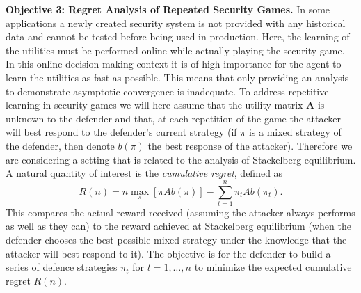 \textbf{Objective 3: Regret Analysis of Repeated Security Games.}
In some applications a newly created security system is not provided with any historical data and cannot be tested before being used in production. Here, the learning of the utilities must be performed online while actually playing the security game. In this online decision-making context it is of high importance for the agent to learn the utilities as fast as possible. This means that only providing an analysis to demonstrate asymptotic convergence\cite{LeslieCollins06,ChapmanEtAl2013} is inadequate. To address repetitive learning in security games we will here assume that the utility matrix $\boldsymbol  A$ is unknown to the defender and that, at each repetition of the game the attacker will best respond to the defender's current strategy (if $\pi$ is a mixed strategy of the defender, then denote $b(\pi)$ the best response of the attacker). Therefore we are considering a setting that is related to the analysis of Stackelberg equilibrium. A natural quantity of interest is the \textit{cumulative regret}, defined as
\begin{equation*}
R(n)=n\max_{\pi} \left[\pi A b(\pi)\right]-\sum_{t=1}^n \pi_t A b(\pi_t).
\end{equation*}
This compares the actual reward received (assuming the attacker always performs as well as they can) to the reward achieved at Stackelberg equilibrium (when the defender chooses the best possible mixed strategy under the knowledge that the attacker will best respond to it).  The objective is for the defender to build a series of defence strategies $\pi_t$ for $t=1,\ldots, n$ to minimize the expected cumulative regret $R(n)$.
% 
%
 
